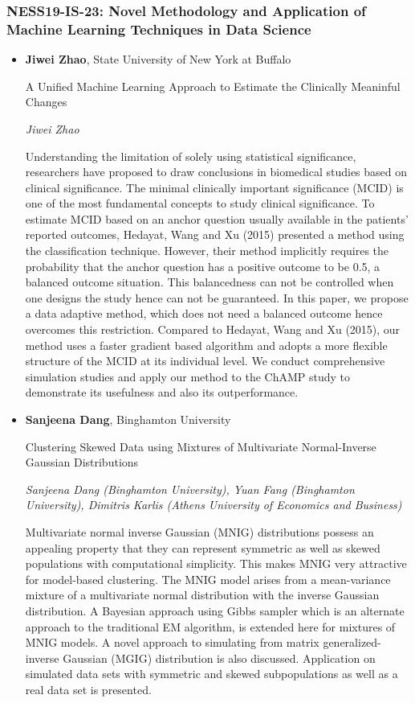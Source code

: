 \subsubsection*{NESS19-IS-23: Novel Methodology and Application of Machine Learning Techniques in Data Science}

\begin{itemize}
\item \textbf{Jiwei Zhao}, State University of New York at Buffalo

A Unified Machine Learning Approach to Estimate the Clinically Meaninful Changes

\emph{\footnotesize Jiwei Zhao}

Understanding the limitation of solely using statistical significance, researchers have proposed to draw conclusions in biomedical studies based on clinical significance. The minimal clinically important significance (MCID) is one of the most fundamental concepts to study clinical significance. To estimate MCID based on an anchor question usually available in the patients' reported outcomes, Hedayat, Wang and Xu (2015) presented a method using the classification technique. However, their method implicitly requires the probability that the anchor question has a positive outcome to be 0.5, a balanced outcome situation. This balancedness can not be controlled when one designs the study hence can not be guaranteed. In this paper, we propose a data adaptive method,  which does not need a balanced outcome hence overcomes this restriction. Compared to Hedayat, Wang and Xu (2015), our method uses a faster gradient based algorithm and adopts a more flexible structure of the MCID at its individual level. We conduct comprehensive simulation studies and apply our method to the ChAMP study to demonstrate its usefulness and also its outperformance.

\item \textbf{Sanjeena Dang}, Binghamton University

Clustering Skewed Data using Mixtures of Multivariate Normal-Inverse Gaussian Distributions

\emph{\footnotesize Sanjeena Dang (Binghamton University), Yuan Fang (Binghamton University), Dimitris Karlis (Athens University of Economics and Business)}

Multivariate normal inverse Gaussian (MNIG) distributions possess an appealing property that they can represent symmetric as well as skewed populations with computational simplicity. This makes MNIG very attractive for model-based clustering. The MNIG model arises from a mean-variance mixture of a multivariate normal distribution with the inverse Gaussian distribution. A Bayesian approach using Gibbs sampler which is an alternate approach to the traditional EM algorithm, is extended here for mixtures of MNIG models. A novel approach to simulating from matrix generalized-inverse Gaussian (MGIG) distribution is also discussed. Application on simulated data sets with symmetric and skewed subpopulations as well as a real data set is presented.


\end{itemize}
